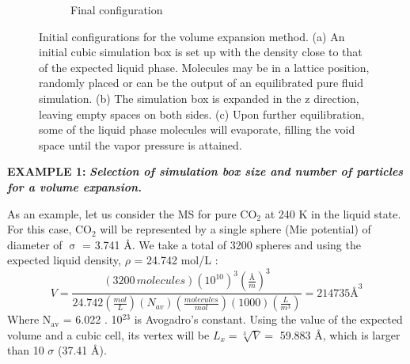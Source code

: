 \documentclass[9pt,bestpractices]{livecoms}
\begin{document}
\begin{figure}
\begin{subfigure}{0.4\textwidth}
    \caption{Final configuration}
	\end{subfigure}
  \caption{Initial configurations for the volume expansion method. (a) An initial
cubic simulation box is set up with the density close to that of the expected
liquid phase. Molecules may be in a lattice position, randomly placed or can be
the output of an equilibrated pure fluid simulation. (b) The simulation box is
expanded in the z direction, leaving empty spaces on both sides. (c) Upon
further equilibration, some of the liquid phase molecules will evaporate,
filling the void space until the vapor pressure is attained.}
\label{fig:5}
\end{figure}

\begin{mdframed}[linewidth=0pt,backgroundcolor=LiveCoMSLightBlue!8,fontcolor=LiveCoMSDarkBlue!80!black]
\textbf{EXAMPLE 1:} \textbf{\textit{Selection of simulation box size and number of particles for a volume expansion.}}

As an example, let us consider the MS for pure CO$_{2}$ at 240 K in the liquid
state. For this case, CO$_{2}$ will be represented by a single sphere (Mie
potential) of diameter of {${\upsigma}$} = 3.741 \AA{}\citep{avendano2011}. We take a total of 3200 spheres
and using the expected liquid density, ${\rho}$ = 24.742 mol/L \citep{lemmon2013}:
\begin{equation}
V=\frac{\left(3200\,molecules\right)\left(10^{10}\right)^{3}\left(\frac{\textrm{Å}}{m}\right)^{3}}{24.742\left(\frac{mol}{L}\right)\left(N_{av}\right)\left(\frac{molecules}{mol}\right)\left(1000\right)\left(\frac{L}{m^{3}}\right)}=214735\textrm{Å}^{3}
\end{equation}
Where N$_{\mathrm{av}}$ = 6.022 . 10$^{23}$ is Avogadro's constant. Using the
value of the expected volume and a cubic cell, its vertex will be
$L_x = \sqrt[3]{V} = $ 59.883 \AA{}, which is larger than 10 $\sigma$  (37.41
\AA{}). 
\end{mdframed}
\end{document}
